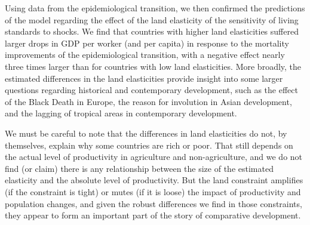 \documentclass[11pt]{article}
\begin{document}
Using data from the epidemiological transition, we then confirmed the predictions of the model regarding the effect of the land elasticity of the sensitivity of living standards to shocks. We find that countries with higher land elasticities suffered larger drops in GDP per worker (and per capita) in response to the mortality improvements of the epidemiological transition, with a negative effect nearly three times larger than for countries with low land elasticities. More broadly, the estimated differences in the land elasticities provide insight into some larger questions regarding historical and contemporary development, such as the effect of the Black Death in Europe, the reason for involution in Asian development, and the lagging of tropical areas in contemporary development. 

We must be careful to note that the differences in land elasticities do not, by themselves, explain why some countries are rich or poor. That still depends on the actual level of productivity in agriculture and non-agriculture, and we do not find (or claim) there is any relationship between the size of the estimated elasticity and the absolute level of productivity. But the land constraint amplifies (if the constraint is tight) or mutes (if it is loose) the impact of productivity and population changes, and given the robust differences we find in those constraints, they appear to form an important part of the story of comparative development.

\newpage

\clearpage

\onehalfspacing
{\small


}

\clearpage
\end{document}
